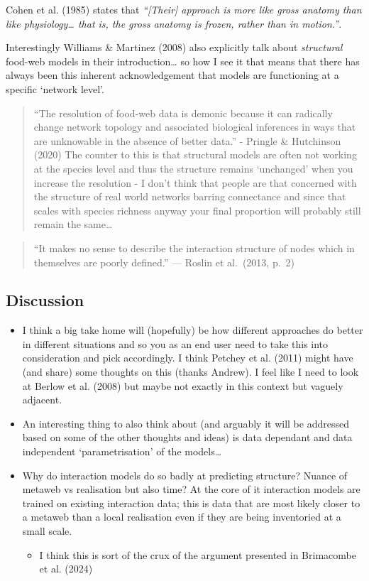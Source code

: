 \documentclass[
]{article}
\providecommand{\tightlist}{%
  \setlength{\itemsep}{0pt}\setlength{\parskip}{0pt}}\usepackage{longtable,booktabs,array}
\begin{document}
Cohen et al. (1985) states that \emph{``{[}Their{]} approach is more
like gross anatomy than like physiology\ldots{} that is, the gross
anatomy is frozen, rather than in motion.''}.

Interestingly Williams \& Martinez (2008) also explicitly talk about
\emph{structural} food-web models in their introduction\ldots{} so how I
see it that means that there has always been this inherent
acknowledgement that models are functioning at a specific `network
level'.

\begin{quote}
``The resolution of food-web data is demonic because it can radically
change network topology and associated biological inferences in ways
that are unknowable in the absence of better data.'' - Pringle \&
Hutchinson (2020) The counter to this is that structural models are
often not working at the species level and thus the structure remains
`unchanged' when you increase the resolution - I don't think that people
are that concerned with the structure of real world networks barring
connectance and since that scales with species richness anyway your
final proportion will probably still remain the same\ldots{}
\end{quote}

\begin{quote}
``It makes no sense to describe the interaction structure of nodes which
in themselves are poorly defined.'' --- Roslin et al.~(2013, p.~2)
\end{quote}

\subsection{Discussion}\label{discussion}

\begin{itemize}
\item
  I think a big take home will (hopefully) be how different approaches
  do better in different situations and so you as an end user need to
  take this into consideration and pick accordingly. I think Petchey et
  al. (2011) might have (and share) some thoughts on this (thanks
  Andrew). I feel like I need to look at Berlow et al. (2008) but maybe
  not exactly in this context but vaguely adjacent.
\item
  An interesting thing to also think about (and arguably it will be
  addressed based on some of the other thoughts and ideas) is data
  dependant and data independent `parametrisation' of the models\ldots{}
\item
  Why do interaction models do so badly at predicting structure? Nuance
  of metaweb vs realisation but also time? At the core of it interaction
  models are trained on existing interaction data; this is data that are
  most likely closer to a metaweb than a local realisation even if they
  are being inventoried at a small scale.

  \begin{itemize}
  \tightlist
  \item
    I think this is sort of the crux of the argument presented in
    Brimacombe et al. (2024)
  \end{itemize}
\end{itemize}
\end{document}
